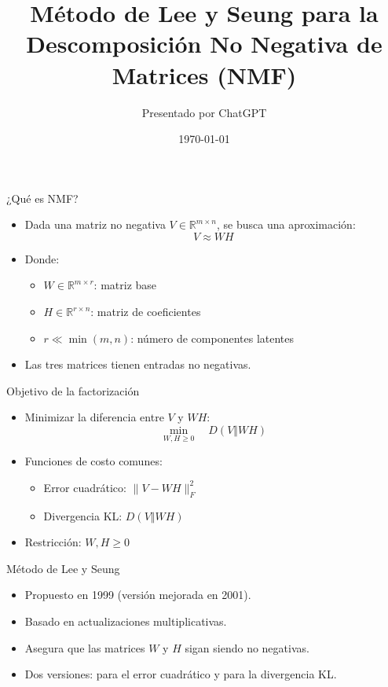 \documentclass{beamer}
\title{Método de Lee y Seung para la Descomposición No Negativa de Matrices (NMF)}
\author{Presentado por ChatGPT}
\date{\today}
\begin{document}
\frame{\titlepage}


\begin{frame}{¿Qué es NMF?}
\begin{itemize}
    \item Dada una matriz no negativa $ V \in \mathbb{R}^{m \times n} $, se busca una aproximación:
    \[
    V \approx WH
    \]
    \item Donde:
    \begin{itemize}
        \item $ W \in \mathbb{R}^{m \times r} $: matriz base
        \item $ H \in \mathbb{R}^{r \times n} $: matriz de coeficientes
        \item $ r \ll \min(m, n) $: número de componentes latentes
    \end{itemize}
    \item Las tres matrices tienen entradas no negativas.
\end{itemize}
\end{frame}

\begin{frame}{Objetivo de la factorización}
\begin{itemize}
    \item Minimizar la diferencia entre $ V $ y $ WH $:
    \[
    \min_{W, H \geq 0} \quad D(V \Vert WH)
    \]
    \item Funciones de costo comunes:
    \begin{itemize}
        \item Error cuadrático: $ \| V - WH \|_F^2 $
        \item Divergencia KL: $ D(V \Vert WH) $
    \end{itemize}
    \item Restricción: $ W, H \geq 0 $
\end{itemize}
\end{frame}

\begin{frame}{Método de Lee y Seung}
\begin{itemize}
    \item Propuesto en 1999 (versión mejorada en 2001).
    \item Basado en actualizaciones multiplicativas.
    \item Asegura que las matrices $ W $ y $ H $ sigan siendo no negativas.
    \item Dos versiones: para el error cuadrático y para la divergencia KL.
\end{itemize}
\end{frame}
\end{document}
